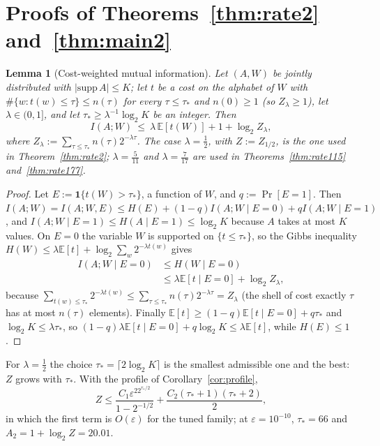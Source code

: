 \documentclass[aps,prx,twocolumn,superscriptaddress,nofootinbib,longbibliography]{revtex4-2}
\theoremstyle{plain}
\newtheorem{lemma}{Lemma}
\theoremstyle{definition}
\theoremstyle{remark}
\newcommand{\E}{\mathbb{E}}
\begin{document}
\section{Proofs of Theorems~\ref{thm:rate2} and~\ref{thm:main2}}\label{app:rate}

\begin{lemma}[Cost-weighted mutual information]\label{lem:gibbs}
Let $(A,W)$ be jointly distributed with $|\mathrm{supp}\,A|\le K$; let $t$ be a cost on the alphabet of $W$ with $\#\{w:t(w)\le\tau\}\le n(\tau)$ for every $\tau\le\tau_*$ and $n(0)\ge1$ (so $Z_\lambda\ge1$), let $\lambda\in(0,1]$, and let $\tau_*\ge\lambda^{-1}\log_2K$ be an integer. Then
\begin{equation}
I(A;W)\ \le\ \lambda\,\E[t(W)]+1+\log_2Z_\lambda,
\end{equation}
where $Z_\lambda:=\sum_{\tau\le\tau_*}n(\tau)2^{-\lambda\tau}$. The case $\lambda=\tfrac12$, with $Z:=Z_{1/2}$, is the one used in Theorem~\ref{thm:rate2}; $\lambda=\tfrac5{11}$ and $\lambda=\tfrac7{17}$ are used in Theorems~\ref{thm:rate115} and~\ref{thm:rate177}.
\end{lemma}
\begin{proof}
Let $E:=\mathbf1\{t(W)>\tau_*\}$, a function of $W$, and $q:=\Pr[E=1]$. Then $I(A;W)=I(A;W,E)\le H(E)+(1-q)I(A;W\mid E=0)+qI(A;W\mid E=1)$, and $I(A;W\mid E=1)\le H(A\mid E=1)\le\log_2K$ because $A$ takes at most $K$ values. On $E=0$ the variable $W$ is supported on $\{t\le\tau_*\}$, so the Gibbs inequality $H(W)\le\lambda\E[t]+\log_2\sum_w2^{-\lambda t(w)}$ gives
\[\begin{aligned}I(A;W\mid E=0)&\le H(W\mid E=0)\\&\le\lambda\E[t\mid E=0]+\log_2Z_\lambda,\end{aligned}\]
because $\sum_{t(w)\le\tau_*}2^{-\lambda t(w)}\le\sum_{\tau\le\tau_*}n(\tau)2^{-\lambda\tau}=Z_\lambda$ (the shell of cost exactly $\tau$ has at most $n(\tau)$ elements). Finally $\E[t]\ge(1-q)\E[t\mid E=0]+q\tau_*$ and $\log_2K\le\lambda\tau_*$, so $(1-q)\lambda\E[t\mid E=0]+q\log_2K\le\lambda\E[t]$, while $H(E)\le1$.
\end{proof}
For $\lambda=\tfrac12$ the choice $\tau_*=\lceil2\log_2K\rceil$ is the smallest admissible one and the best: $Z$ grows with $\tau_*$. With the profile of Corollary~\ref{cor:profile},
\begin{equation}
Z\le\frac{C_1\varepsilon^22^{\tau_*/2}}{1-2^{-1/2}}+\frac{C_2(\tau_*+1)(\tau_*+2)}2,
\end{equation}
in which the first term is $O(\varepsilon)$ for the tuned family; at $\varepsilon=10^{-10}$, $\tau_*=66$ and $A_2=1+\log_2Z=20.01$.
\end{document}
